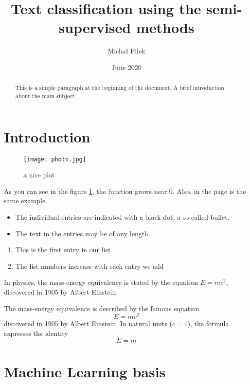 \documentclass[12pt]{article}
\title{Text classification using the semi-supervised methods}
\author{Michał Filek}
\date{June 2020}
\begin{document}
\maketitle
\begin{abstract}
This is a simple paragraph at the beginning of the 
document. A brief introduction about the main subject.
\end{abstract}

\tableofcontents


\section{Introduction}
\begin{figure}[h]
    \centering
    \texttt{[image: photo.jpg]}
    \caption{a nice plot}
    \label{fig:photo}
\end{figure}

As you can see in the figure \ref{fig:photo}, the 
function grows near 0. Also, in the page \pageref{fig:photo} 
is the same example.

\begin{itemize}
  \item The individual entries are indicated with a black dot, a so-called bullet.
  \item The text in the entries may be of any length.
\end{itemize}

\begin{enumerate}
  \item This is the first entry in our list
  \item The list numbers increase with each entry we add
\end{enumerate}

In physics, the mass-energy equivalence is stated 
by the equation $E=mc^2$, discovered in 1905 by Albert Einstein.

The mass-energy equivalence is described by the famous equation
\[ E=mc^2 \]
discovered in 1905 by Albert Einstein. 
In natural units ($c = 1$), the formula expresses the identity
\begin{equation}
E=m
\end{equation}




\section{Machine Learning basis}
\end{document}
